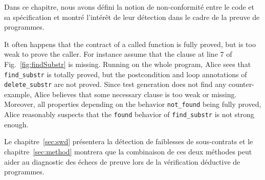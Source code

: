 Dans ce chapitre, nous avons défini la notion de non-conformité entre le code
et sa spécification et montré l'intérêt de leur détection dans le cadre de la
preuve de programmes.


It often happens that the contract of a called function is
fully proved, but is too weak to prove the caller.
For instance assume that the clause at line 7 of Fig.~\ref{fig:findSubstr} is
missing. Running \Wp on the whole program, Alice sees that
\lstinline{find_substr} is totally proved, but the postcondition and loop
annotations of \lstinline{delete_substr} are not proved. Since test generation
does not find any counter-example, Alice believes that some necessary clause is
too weak or missing.
Moreover, all properties depending on the behavior \lstinline{not_found} being
fully proved, Alice reasonably suspects that the \lstinline{found} behavior of
\lstinline{find_substr} is not strong enough.


Le chapitre~\ref{sec:swd} présentera la détection de faiblesses de sous-contrats
et le chapitre~\ref{sec:method} montrera que la combinaison de ces deux méthodes
peut aider au diagnostic des échecs de preuve lors de la vérification déductive
de programmes.
